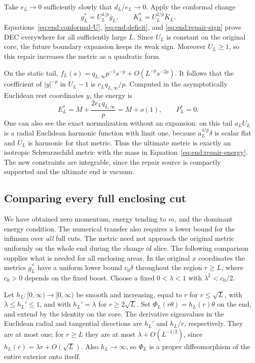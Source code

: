Take $e_L\to0$ sufficiently slowly that $d_L/e_L\to0$.
Apply the conformal change
\[
 g_L^*=U_L^{4/p}\bar g_L,\qquad K_L^*=U_L^{2/p}\bar K_L.
\]
Equations~\eqref{eq:end:conformal-U}, \eqref{eq:end:deficit},
and \eqref{eq:end:repair-sign} prove DEC everywhere for all
sufficiently large $L$.  Since $U_L$ is constant on the original
core, the future boundary expansion keeps its weak sign.
Moreover $U_L\ge1$, so this repair increases the metric as a
quadratic form.

On the static tail, $f_L(s)=q_{L,\infty}p^{-1}s^{-p}
+O(L^{-p}s^{-2p})$.  It follows that the coefficient of $|y|^{-p}$
in $U_L-1$ is $e_Lq_{L,\infty}/p$.  Computed in the
asymptotically Euclidean rest coordinates $y$, the energy is
\begin{equation}\label{eq:end:repair-energy}
 E_L^*=M+\frac{2e_Lq_{L,\infty}}p=M+o(1),\qquad P_L^*=0.
\end{equation}
One can also see the exact normalization without an expansion:
on this tail $a_LU_L$ is a radial Euclidean harmonic function
with limit one, because $a_L^{4/p}\delta$ is scalar flat and
$U_L$ is harmonic for that metric.  Thus the ultimate metric
is exactly an isotropic Schwarzschild metric with the mass in
Equation~\eqref{eq:end:repair-energy}.  The new constraints
are integrable, since the repair source is compactly supported
and the ultimate end is vacuum.

\subsection{Comparing every full enclosing cut}

We have obtained zero momentum, energy tending to $m$, and the
dominant energy condition.  The numerical transfer also requires a
lower bound for the infimum over \emph{all} full cuts.  The metric
need not approach the original metric uniformly on
the whole end during the change of slice.  The following
comparison supplies what is needed for all enclosing areas.
In the original $x$ coordinates the metrics $g_L^*$ have a
uniform lower bound $c_0\delta$ throughout the region $r\ge L$,
where $c_0>0$ depends on the fixed boost.  Choose a fixed
$0<\lambda<1$ with $\lambda^2<c_0/2$.

Let $h_L:[0,\infty)\to[0,\infty)$ be smooth and increasing,
equal to $r$ for $r\le\sqrt L$, with $\lambda\le h_L'\le1$,
and with $h_L'=\lambda$ for $r\ge2\sqrt L$.
Set $\Phi_L(r\theta)=h_L(r)\theta$ on the end, and extend by
the identity on the core.  The derivative eigenvalues in the
Euclidean radial and tangential directions are $h_L'$ and
$h_L/r$, respectively.  They are at most one; for $r\ge L$
they are at most $\lambda+O(L^{-1/2})$, since
$h_L(r)=\lambda r+O(\sqrt L)$.  Also $h_L\to\infty$, so
$\Phi_L$ is a proper diffeomorphism of the entire exterior
onto itself.


